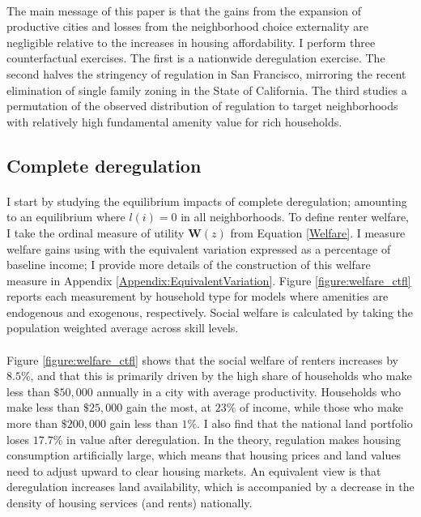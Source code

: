 \documentclass[12pt]{article}
\begin{document}
\paragraph*{}
The main message of this paper is that the gains from the expansion of productive cities and losses from the neighborhood choice externality are negligible relative to the increases in housing affordability. I perform three counterfactual exercises. The first is a nationwide deregulation exercise. The second halves the stringency of regulation in San Francisco, mirroring the recent elimination of single family zoning in the State of California. The third studies a permutation of the observed distribution of regulation to target neighborhoods with relatively high fundamental amenity value for rich households. 

\subsection{Complete deregulation}\label{Ctfl:CompleteDeregulation}
\paragraph*{}
I start by studying the equilibrium impacts of complete deregulation; amounting to an equilibrium where $l(i) = 0$ in all neighborhoods. To define renter welfare, I take the ordinal measure of utility $\boldsymbol{W}(z)$ from Equation \eqref{Welfare}. I measure welfare gains using with the equivalent variation expressed as a percentage of baseline income; I provide more details of the construction of this welfare measure in Appendix \ref{Appendix:EquivalentVariation}. Figure \ref{figure:welfare_ctfl} reports each measurement by household type for models where amenities are endogenous and exogenous, respectively. Social welfare is calculated by taking the population weighted average across skill levels.

\paragraph*{} Figure \ref{figure:welfare_ctfl} shows that the social welfare of renters increases by $8.5\%$, and that this is primarily driven by the high share of households who make less than $\$50,000$ annually in a city with average productivity. Households who make less than $\$25,000$ gain the most, at $23\%$ of income, while those who make more than $\$200,000$ gain less than $1\%$. I also find that the national land portfolio loses $17.7\%$ in value after deregulation. In the theory, regulation makes housing consumption artificially large, which means that housing prices and land values need to adjust upward to clear housing markets. An equivalent view is that deregulation increases land availability, which is accompanied by a decrease in the density of housing services (and rents) nationally.
\end{document}
